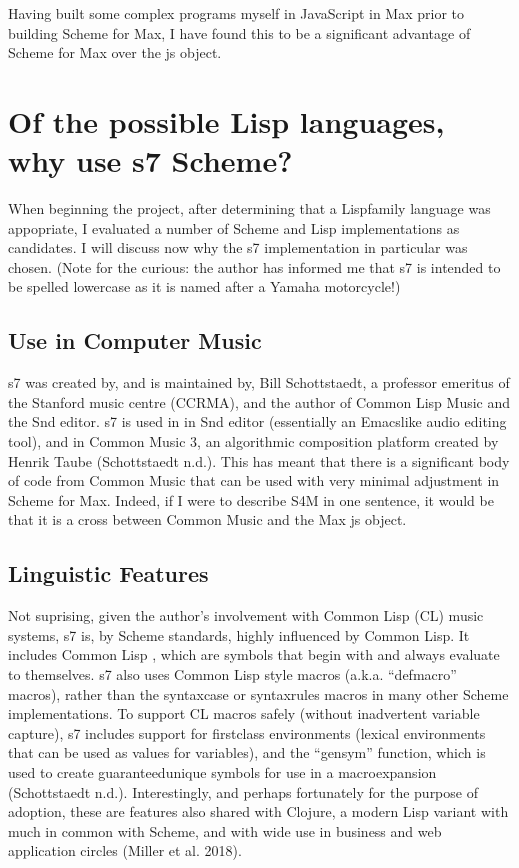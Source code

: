 \documentclass[letterpaper,10pt,english]{sphinxmanual}
\begin{document}
\sphinxAtStartPar
Having built some complex programs myself in JavaScript in Max prior to building Scheme for Max,
I have found this to be a significant advantage of Scheme for Max over the js object.


\section{Of the possible Lisp languages, why use s7 Scheme?}
\label{\detokenize{design:of-the-possible-lisp-languages-why-use-s7-scheme}}
\sphinxAtStartPar
When beginning the project, after determining that a Lisp\sphinxhyphen{}family language was appopriate, I evaluated a number of
Scheme and Lisp implementations as candidates.
I will discuss now why the s7 implementation in particular was chosen.
(Note for the curious: the author has informed me that s7 is intended to be spelled lowercase
as it is named after a Yamaha motorcycle!)


\subsection{Use in Computer Music}
\label{\detokenize{design:use-in-computer-music}}
\sphinxAtStartPar
s7 was created by, and is maintained by, Bill Schottstaedt, a professor emeritus of the Stanford music centre (CCRMA),
and the author of Common Lisp Music and the Snd editor.
s7 is used in in Snd editor (essentially an Emacs\sphinxhyphen{}like audio editing tool), and in Common Music 3, an algorithmic composition
platform created by Henrik Taube (Schottstaedt n.d.).
This has meant that there is a significant body of code from Common Music that can be used with very minimal adjustment in Scheme for Max.
Indeed, if I were to describe S4M in one sentence, it would be that it is a cross between Common Music and the Max js object.


\subsection{Linguistic Features}
\label{\detokenize{design:linguistic-features}}
\sphinxAtStartPar
Not suprising, given the author’s involvement with Common Lisp (CL) music systems, s7 is, by Scheme standards,
highly influenced by Common Lisp.
It includes Common Lisp , which are symbols that begin with and always evaluate to themselves.
s7 also uses Common Lisp style macros (a.k.a. “defmacro” macros), rather than the syntax\sphinxhyphen{}case or syntax\sphinxhyphen{}rules macros
in many other Scheme implementations.
To support CL macros safely (without inadvertent variable capture), s7 includes support for first\sphinxhyphen{}class environments
(lexical environments that can be used as values for variables), and the “gensym” function, which is used to create
guaranteed\sphinxhyphen{}unique symbols for use in a macroexpansion (Schottstaedt n.d.).
Interestingly, and perhaps fortunately for the purpose of adoption, these are features also shared with Clojure,
a modern Lisp variant with much in common with Scheme, and with wide use in business and web application circles
(Miller et al. 2018).
\end{document}
